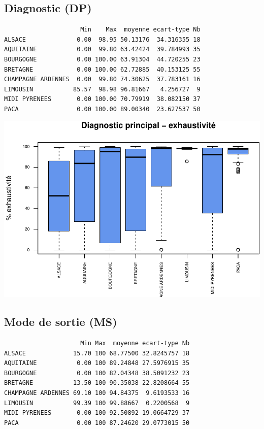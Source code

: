 \documentclass[]{article}
\begin{document}
\subsection{Diagnostic (DP)}\label{diagnostic-dp-2}

\begin{verbatim}
                     Min    Max  moyenne ecart-type Nb
ALSACE              0.00  98.95 50.13176  34.316355 18
AQUITAINE           0.00  99.80 63.42424  39.784993 35
BOURGOGNE           0.00 100.00 63.91304  44.720255 23
BRETAGNE            0.00 100.00 62.72885  40.153125 55
CHAMPAGNE ARDENNES  0.00  99.80 74.30625  37.783161 16
LIMOUSIN           85.57  98.98 96.81667   4.256727  9
MIDI PYRENEES       0.00 100.00 70.79919  38.082150 37
PACA                0.00 100.00 89.00340  23.627537 50
\end{verbatim}

\includegraphics{septembre2015_files/figure-latex/unnamed-chunk-30-1.pdf}

\subsection{Mode de sortie (MS)}\label{mode-de-sortie-ms-2}

\begin{verbatim}
                     Min Max  moyenne ecart-type Nb
ALSACE             15.70 100 68.77500 32.8245757 18
AQUITAINE           0.00 100 89.24848 27.5976915 35
BOURGOGNE           0.00 100 82.04348 38.5091232 23
BRETAGNE           13.50 100 90.35038 22.8208664 55
CHAMPAGNE ARDENNES 69.10 100 94.84375  9.6193533 16
LIMOUSIN           99.39 100 99.88667  0.2200568  9
MIDI PYRENEES       0.00 100 92.50892 19.0664729 37
PACA                0.00 100 87.24620 29.0773015 50
\end{verbatim}
\end{document}
